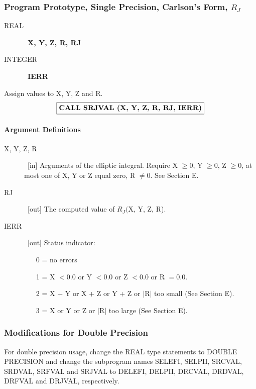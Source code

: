 \documentclass[twoside]{MATH77}
\begin{document}
\subsubsection{Program Prototype, Single Precision, Carlson's Form, $R_J$}

\begin{description}
\item[REAL]  \ {\bf X, Y, Z, R, RJ}

\item[INTEGER]  \ {\bf IERR}
\end{description}

Assign values to X, Y, Z and R.
$$
\fbox{\bf CALL SRJVAL (X, Y, Z, R, RJ, IERR)}
$$
\paragraph{Argument Definitions}

\begin{description}
\item[X, Y, Z, R]  \ [in] Arguments of the elliptic integral. Require X $%
\geq 0$, Y $\geq 0$, Z $\geq 0$, at most one of X, Y or Z equal zero, R $\neq
0$. See Section E.

\item[RJ]  \ [out] The computed value of $R_J($X, Y, Z, R).

\item[IERR]  \ [out] Status indicator:

\begin{itemize}
\item[0 =]  no errors

\item[1 =]  X $<0.0$ or Y $<0.0$ or Z $<0.0$ or R $=0.0.$

\item[2 =]  X + Y or X + Z or Y + Z or $|$R$|$ too small (See Section E).

\item[3 =]  X or Y or Z or $|$R$|$ too large (See Section E).
\end{itemize}
\end{description}

\subsubsection{Modifications for Double Precision}

For double precision usage, change the REAL type statements to DOUBLE
PRECISION and change the subprogram names SELEFI, SELPII, SRCVAL, SRDVAL,
SRFVAL and SRJVAL to DELEFI, DELPII, DRCVAL, DRDVAL, DRFVAL and DRJVAL,
respectively.
\end{document}
